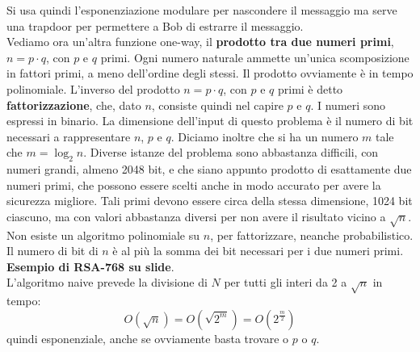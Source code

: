 \documentclass[a4paper,12pt, oneside]{book}
\begin{document}
Si usa quindi l'esponenziazione modulare per nascondere il messaggio ma serve
una trapdoor per permettere a Bob di estrarre il messaggio.\\
Vediamo ora un'altra funzione one-way, il \textbf{prodotto tra due numeri
  primi}, $n=p\cdot q$, con $p$ e $q$ primi. Ogni numero naturale ammette
un'unica scomposizione in fattori primi, 
a meno dell'ordine degli stessi. Il prodotto ovviamente è in tempo polinomiale.
L'inverso del prodotto $n=p\cdot q$, con $p$ e
$q$ primi è detto \textbf{fattorizzazione}, che, dato $n$, consiste quindi nel
capire $p$ e $q$. I numeri sono espressi in binario. La dimensione dell'input di
questo problema è il numero di bit necessari a rappresentare $n$, $p$ e
$q$. Diciamo inoltre che si ha un numero $m$ tale che $m=\log_2n$. Diverse
istanze del problema sono abbastanza difficili, con numeri grandi, almeno 2048
bit, e che siano appunto prodotto di esattamente due numeri primi, che possono
essere scelti anche in modo accurato per avere la sicurezza migliore. Tali primi
devono essere circa della stessa dimensione, 1024 bit ciascuno, ma con valori
abbastanza diversi per non avere il risultato vicino a $\sqrt{n}$. \\
Non esiste un algoritmo polinomiale su $n$, per fattorizzare, neanche
probabilistico. Il numero di bit di $n$ è al più la somma dei bit necessari per
i due numeri primi.\\
\textbf{Esempio di RSA-768 su slide}.\\
L'algoritmo naive prevede la divisione di $N$ per tutti gli interi da 2 a
$\sqrt{n}$ in tempo:
\[O(\sqrt{n})=O(\sqrt{2^m})=O(2^{\frac{m}{2}})\]
quindi esponenziale, anche se ovviamente basta trovare o $p$ o $q$.\\
\end{document}
